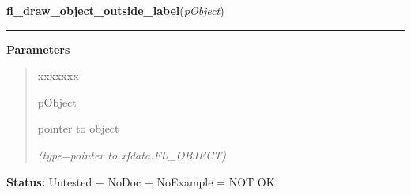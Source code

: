     \label{xformslib:library:fl_draw_object_label_outside}

    \vspace{0.5ex}

\hspace{.8\funcindent}\begin{boxedminipage}{\funcwidth}

    \raggedright \textbf{fl\_draw\_object\_outside\_label}(\textit{pObject})

    \vspace{-1.5ex}

    \rule{\textwidth}{0.5\fboxrule}
\setlength{\parskip}{2ex}
\setlength{\parskip}{1ex}
      \textbf{Parameters}
      \vspace{-1ex}

      \begin{quote}
        \begin{Ventry}{xxxxxxx}

          \item[pObject]

          pointer to object

            {\it (type=pointer to xfdata.FL\_OBJECT)}

        \end{Ventry}

      \end{quote}

\textbf{Status:} Untested + NoDoc + NoExample = NOT OK



    \end{boxedminipage}

    \label{xformslib:library:fl_get_object_component}

    \vspace{0.5ex}

